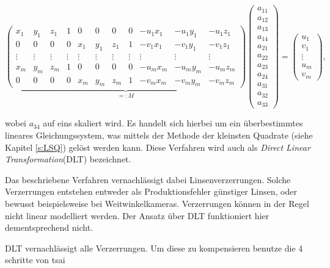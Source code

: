  \setcounter{MaxMatrixCols}{20}
\begin{equation}\label{eq:DLT}
\underbrace{\begin{pmatrix}
x_1 & y_1 & z_1 & 1 & 0 & 0 & 0 & 0 & -u_1 x_1 & -u_1 y_1 & -u_1z_1 \\
0 & 0 & 0 & 0 & x_1 & y_1 & z_1 & 1 & -v_1x_1 & -v_1y_1 & -v_1z_1 \\
\vdots & \vdots & \vdots & \vdots & \vdots & \vdots & \vdots & \vdots & \vdots & \vdots & \vdots\\
x_m & y_m & z_m & 1 & 0 & 0 & 0 & 0 & -u_m x_m & -u_m y_m & -u_m z_m \\
0 & 0 & 0 & 0 & x_m & y_m & z_m & 1 & -v_mx_m & -v_my_m & -v_mz_m
\end{pmatrix}}_{=:M}
\begin{pmatrix}
a_{11} \\ a_{12} \\ a_{13} \\ a_{14} \\ a_{21} \\ a_{22} \\ a_{23} \\ a_{24} \\ a_{31} \\ a_{32} \\ a_{33}
\end{pmatrix} = 
\begin{pmatrix}
u_1 \\ v_1 \\ \vdots \\ u_m \\ v_m
\end{pmatrix},
\end{equation}

wobei $a_{34}$ auf eins skaliert wird.  Es handelt sich hierbei um ein überbestimmtes lineares Gleichungssystem, was mittels der Methode der kleinsten Quadrate (siehe Kapitel \ref{s:LSQ}) gelöst werden kann. 
Diese Verfahren wird auch als \textit{Direct Linear Transformation}(DLT) bezeichnet.
 
Das beschriebene Verfahren vernachlässigt dabei Linsenverzerrungen. Solche Verzerrungen entstehen entweder als Produktionsfehler günstiger Linsen, oder bewusst beispielsweise bei Weitwinkelkameras. Verzerrungen können in der Regel nicht linear modelliert werden. Der Ansatz über DLT funktioniert hier dementsprechend nicht. 
 
 DLT vernachlässigt alle Verzerrungen. Um diese zu kompensieren benutze die 4 schritte von tsai
 

